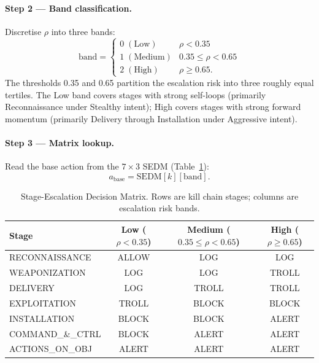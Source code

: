 \paragraph{Step 2 — Band classification.}
Discretise $\rho$ into three bands:
%
\begin{equation}
  \text{band} =
  \begin{cases}
    0 \; (\text{Low})    & \rho < 0.35 \\
    1 \; (\text{Medium}) & 0.35 \leq \rho < 0.65 \\
    2 \; (\text{High})   & \rho \geq 0.65.
  \end{cases}
\end{equation}
%
The thresholds 0.35 and 0.65 partition the escalation risk into three
roughly equal tertiles.
The Low band covers stages with strong self-loops (primarily Reconnaissance
under Stealthy intent); High covers stages with strong forward momentum
(primarily Delivery through Installation under Aggressive intent).

\paragraph{Step 3 — Matrix lookup.}
Read the base action from the $7 \times 3$ SEDM
(Table~\ref{tab:sedm_matrix}):
%
\begin{equation}
  a_{\text{base}} = \text{SEDM}[k][\text{band}].
\end{equation}

\begin{table}[ht]
  \centering
  \caption{Stage-Escalation Decision Matrix.
           Rows are kill chain stages; columns are escalation risk bands.}
  \label{tab:sedm_matrix}
  \begin{tabular}{lccc}
    \toprule
    Stage & Low ($\rho < 0.35$) & Medium ($0.35 \leq \rho < 0.65$) & High ($\rho \geq 0.65$) \\
    \midrule
    RECONNAISSANCE   & ALLOW & LOG   & LOG   \\
    WEAPONIZATION    & LOG   & LOG   & TROLL \\
    DELIVERY         & LOG   & TROLL & TROLL \\
    EXPLOITATION     & TROLL & BLOCK & BLOCK \\
    INSTALLATION     & BLOCK & BLOCK & ALERT \\
    COMMAND\_\&\_CTRL & BLOCK & ALERT & ALERT \\
    ACTIONS\_ON\_OBJ & ALERT & ALERT & ALERT \\
    \bottomrule
  \end{tabular}
\end{table}

